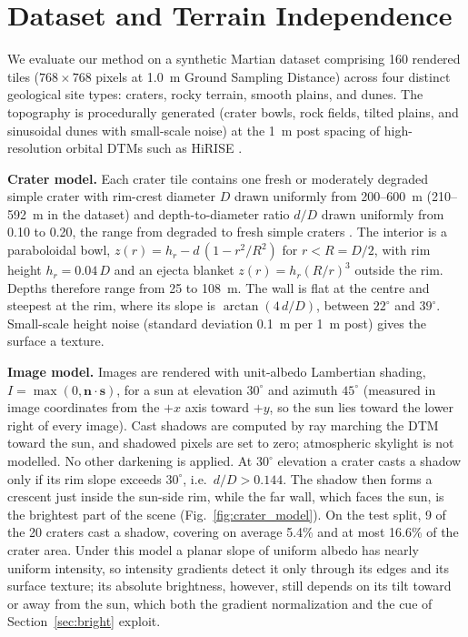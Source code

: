 \documentclass{article}
\begin{document}
\section{Dataset and Terrain Independence}
We evaluate our method on a synthetic Martian dataset comprising 160 rendered tiles ($768 \times 768$ pixels at 1.0~m Ground Sampling Distance) across four distinct geological site types: craters, rocky terrain, smooth plains, and dunes. The topography is procedurally generated (crater bowls, rock fields, tilted plains, and sinusoidal dunes with small-scale noise) at the 1~m post spacing of high-resolution orbital DTMs such as HiRISE \cite{mcewen2007hirise}.

\textbf{Crater model.} Each crater tile contains one fresh or moderately degraded simple crater with rim-crest diameter $D$ drawn uniformly from 200--600~m (210--592~m in the dataset) and depth-to-diameter ratio $d/D$ drawn uniformly from 0.10 to 0.20, the range from degraded to fresh simple craters \cite{pike1977size,melosh1989impact}. The interior is a paraboloidal bowl, $z(r) = h_r - d\,(1 - r^2/R^2)$ for $r < R = D/2$, with rim height $h_r = 0.04\,D$ and an ejecta blanket $z(r) = h_r (R/r)^3$ outside the rim. Depths therefore range from 25 to 108~m. The wall is flat at the centre and steepest at the rim, where its slope is $\arctan(4\,d/D)$, between $22^\circ$ and $39^\circ$. Small-scale height noise (standard deviation 0.1~m per 1~m post) gives the surface a texture.

\textbf{Image model.} Images are rendered with unit-albedo Lambertian shading, $I = \max(0, \mathbf{n}\cdot\mathbf{s})$, for a sun at elevation $30^\circ$ and azimuth $45^\circ$ (measured in image coordinates from the $+x$ axis toward $+y$, so the sun lies toward the lower right of every image). Cast shadows are computed by ray marching the DTM toward the sun, and shadowed pixels are set to zero; atmospheric skylight is not modelled. No other darkening is applied. At $30^\circ$ elevation a crater casts a shadow only if its rim slope exceeds $30^\circ$, i.e.\ $d/D > 0.144$. The shadow then forms a crescent just inside the sun-side rim, while the far wall, which faces the sun, is the brightest part of the scene (Fig.~\ref{fig:crater_model}). On the test split, 9 of the 20 craters cast a shadow, covering on average 5.4\% and at most 16.6\% of the crater area. Under this model a planar slope of uniform albedo has nearly uniform intensity, so intensity gradients detect it only through its edges and its surface texture; its absolute brightness, however, still depends on its tilt toward or away from the sun, which both the gradient normalization and the cue of Section~\ref{sec:bright} exploit.
\end{document}
